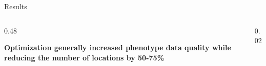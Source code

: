 \documentclass[final]{beamer}
\newlength{\onecolwid}
\newlength{\twocolwid}
\begin{document}
\begin{frame}[t]
\begin{columns}[t]
\begin{column}{\twocolwid}
\begin{block}{Results}
\begin{columns}[t,totalwidth=\twocolwid]
\begin{column}{0.48\twocolwid}
\vspace{1cm}

\textbf{Optimization generally increased phenotype data quality while reducing the number of locations by 50-75\%}


\vspace{1cm}


%
%

\end{column}

\begin{column}{0.02\twocolwid}
\end{column}



\end{columns}




%
%
%
%
%
%
%
%
%
%
%
%
%



\end{block}


\end{column}
\end{columns}
\end{frame}
\end{document}
